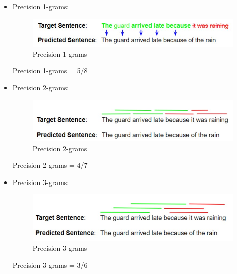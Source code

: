 \documentclass[14pt, a4paper]{article}
\numberwithin{equation}{section}
\numberwithin{algorithm}{section}
\numberwithin{figure}{section}
\numberwithin{table}{section}
\numberwithin{dl}{section}
\numberwithin{md}{section}
\numberwithin{bd}{section}
\numberwithin{dn}{section}
\numberwithin{hq}{section}
\begin{document}
    \begin{itemize}
        \item Precision 1-grams:
        
        \begin{figure}[h!] \centering

            \includegraphics[scale=0.8]{BLEU_1.jpg}
            \caption{Precision 1-grams}

        \end{figure}

        Precision 1-grams = 5/8

        \item Precision 2-grams:
        
        \begin{figure}[h!] \centering

            \includegraphics[scale=0.8]{BLEU_2.jpg}
            \caption{Precision 2-grams}

        \end{figure}

        Precision 2-grams = 4/7

        \item Precision 3-grams:
        
        \begin{figure}[h!] \centering

            \includegraphics[scale=0.8]{BLEU_3.jpg}
            \caption{Precision 3-grams}

        \end{figure}

        Precision 3-grams = 3/6


\end{itemize}
\end{document}

